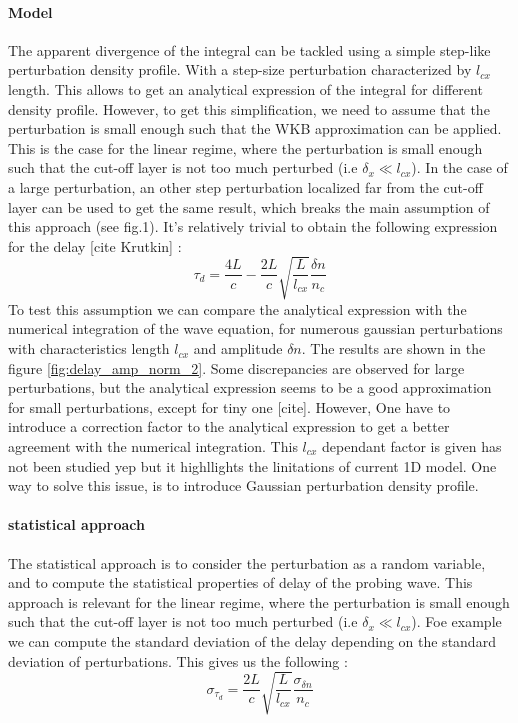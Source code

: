 \documentclass[11pt,a4paper]{report}
\begin{document}
\begin{multicols}{2}
    \paragraph{Model}

    The apparent divergence of the integral can be tackled using a simple step-like perturbation density profile.
    With a step-size perturbation characterized by $l_{cx}$ length. This allows to get an analytical expression of the integral for different density profile. However, to get this simplification, we need to assume that the perturbation is small enough such that the WKB approximation can be applied.
    This is the case for the linear regime, where the perturbation is small enough such that the cut-off layer is not too much perturbed (i.e $\delta_x \ll l_{cx}$). In the case of a large perturbation, an other step perturbation localized far from the cut-off layer can be used to get the same result, which breaks the main assumption of this approach (see fig.1).
    It's relatively trivial to obtain the following expression for the delay [cite Krutkin] :
    $$\tau_d = \frac{4L}{c} - \frac{2L}{c}\sqrt{\frac{L}{l_{cx}}}\frac{\delta n}{n_c} $$
    To test this assumption we can compare the analytical expression with the numerical integration of the wave equation, for numerous gaussian perturbations with characteristics length $l_{cx}$ and amplitude $\delta n$. The results are shown in the figure \ref{fig:delay_amp_norm_2}. Some discrepancies are observed for large perturbations, but the analytical expression seems to be a good approximation for small perturbations, except for tiny one [cite]. However, One have to introduce a correction
    factor to the analytical expression to get a better agreement with the numerical integration. This $l_{cx}$ dependant factor is given has not been studied yep but it highllights the linitations of current 1D model.
    One way to solve this issue, is to introduce Gaussian perturbation density profile.
    \paragraph{statistical approach}
    The statistical approach is to consider the perturbation as a random variable, and to compute the statistical properties of delay of the probing wave. This approach is relevant for the linear regime, where the perturbation is small enough such that the cut-off layer is not too much perturbed (i.e $\delta_x \ll l_{cx}$). Foe example we can compute the standard deviation of the delay depending on the standard deviation of perturbations.
    This gives us the following :
    $$\sigma_{\tau_d} = \frac{2L}{c}\sqrt{\frac{L}{l_{cx}}}\frac{\sigma_{\delta n}}{n_c}$$

\end{multicols}
\end{document}
